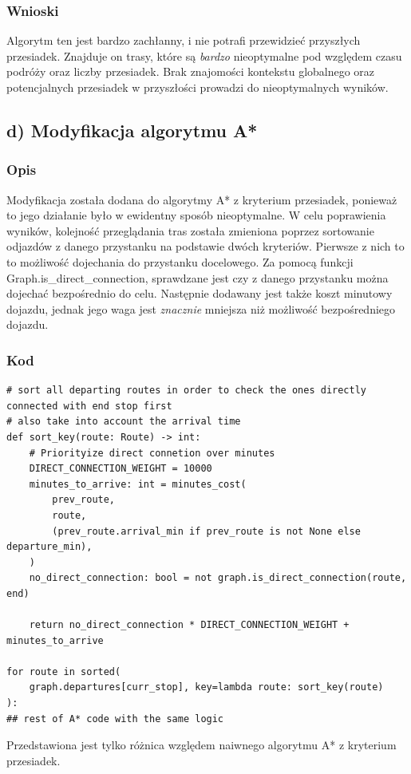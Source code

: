 \documentclass[a4paper, 12pt]{article}
\begin{document}
  \subsubsection{Wnioski}
  Algorytm ten jest bardzo zachłanny, i nie potrafi przewidzieć przyszłych przesiadek.
  Znajduje on trasy, które są \textit{bardzo} nieoptymalne pod względem czasu 
  podróży oraz liczby przesiadek. Brak znajomości kontekstu globalnego oraz 
  potencjalnych przesiadek w przyszłości prowadzi do nieoptymalnych wyników.

  \subsection{d) Modyfikacja algorytmu A*}

  \subsubsection{Opis}
  Modyfikacja została dodana do algorytmy A* z kryterium przesiadek, 
  ponieważ to jego działanie było w ewidentny sposób nieoptymalne.
  W celu poprawienia wyników, kolejność przeglądania tras została zmieniona
  poprzez sortowanie odjazdów z danego przystanku na podstawie dwóch kryteriów.
  Pierwsze z nich to to możliwość dojechania do przystanku docelowego.
  Za pomocą funkcji Graph.is\_direct\_connection, sprawdzane jest czy z danego przystanku
  można dojechać bezpośrednio do celu. Następnie dodawany jest także koszt minutowy dojazdu,
  jednak jego waga jest \textit{znacznie} mniejsza niż możliwość bezpośredniego dojazdu.

  \subsubsection{Kod}
\begin{lstlisting}
# sort all departing routes in order to check the ones directly connected with end stop first
# also take into account the arrival time
def sort_key(route: Route) -> int:
    # Priorityize direct connetion over minutes
    DIRECT_CONNECTION_WEIGHT = 10000
    minutes_to_arrive: int = minutes_cost(
        prev_route,
        route,
        (prev_route.arrival_min if prev_route is not None else departure_min),
    )
    no_direct_connection: bool = not graph.is_direct_connection(route, end)

    return no_direct_connection * DIRECT_CONNECTION_WEIGHT + minutes_to_arrive

for route in sorted(
    graph.departures[curr_stop], key=lambda route: sort_key(route)
):
## rest of A* code with the same logic
\end{lstlisting}
Przedstawiona jest tylko różnica względem naiwnego algorytmu A* z kryterium przesiadek.
\end{document}
